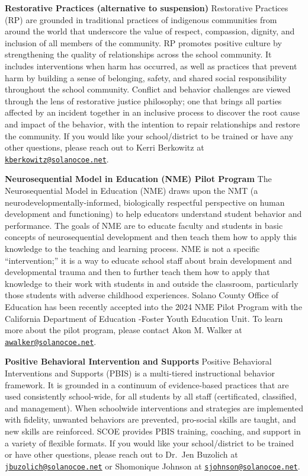 \documentclass[
  10pt,
  letterpaper,
  DIV=11,
  numbers=noendperiod]{scrartcl}
\begin{document}
\textbf{Restorative Practices (alternative to suspension)} Restorative
Practices (RP) are grounded in traditional practices of indigenous
communities from around the world that underscore the value of respect,
compassion, dignity, and inclusion of all members of the community. RP
promotes positive culture by strengthening the quality of relationships
across the school community. It includes interventions when harm has
occurred, as well as practices that prevent harm by building a sense of
belonging, safety, and shared social responsibility throughout the
school community. Conflict and behavior challenges are viewed through
the lens of restorative justice philosophy; one that brings all parties
affected by an incident together in an inclusive process to discover the
root cause and impact of the behavior, with the intention to repair
relationships and restore the community. If you would like your
school/district to be trained or have any other questions, please reach
out to Kerri Berkowitz at
\href{mailto:kberkowitz@solanocoe.net}{\nolinkurl{kberkowitz@solanocoe.net}}.

\textbf{Neurosequential Model in Education (NME) Pilot Program} The
Neurosequential Model in Education (NME) draws upon the NMT (a
neurodevelopmentally-informed, biologically respectful perspective on
human development and functioning) to help educators understand student
behavior and performance. The goals of NME are to educate faculty and
students in basic concepts of neurosequential development and then teach
them how to apply this knowledge to the teaching and learning process.
NME is not a specific ``intervention;'' it is a way to educate school
staff about brain development and developmental trauma and then to
further teach them how to apply that knowledge to their work with
students in and outside the classroom, particularly those students with
adverse childhood experiences. Solano County Office of Education has
been recently accepted into the 2024 NME Pilot Program with the
California Department of Education -Foster Youth Education Unit. To
learn more about the pilot program, please contact Akon M. Walker at
\href{mailto:awalker@solanocoe.net}{\nolinkurl{awalker@solanocoe.net}}.

\textbf{Positive Behavioral Intervention and Supports} Positive
Behavioral Interventions and Supports (PBIS) is a multi-tiered
instructional behavior framework. It is grounded in a continuum of
evidence-based practices that are used consistently school-wide, for all
students by all staff (certificated, classified, and management). When
schoolwide interventions and strategies are implemented with fidelity,
unwanted behaviors are prevented, pro-social skills are taught, and new
skills are reinforced. SCOE provides PBIS training, coaching, and
support in a variety of flexible formats. If you would like your
school/district to be trained or have other questions, please reach out
to Dr.~Jen Buzolich at
\href{mailto:jbuzolich@solanocoe.net}{\nolinkurl{jbuzolich@solanocoe.net}}
or Shomonique Johnson at
\href{mailto:sjohnson@solanocoe.net}{\nolinkurl{sjohnson@solanocoe.net}}.
\end{document}

